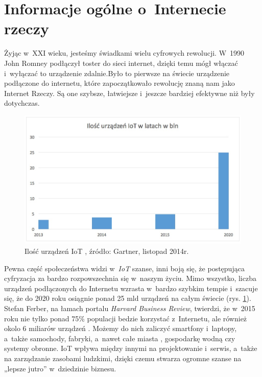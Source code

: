 \documentclass{xmgr}
\begin{document}
\section{Informacje ogólne o~Internecie rzeczy}
	Żyjąc w~XXI wieku, jesteśmy świadkami wielu cyfrowych rewolucji. W~1990 John Romney podłączył toster do sieci internet, dzięki temu mógł włączać i~wyłączać to urządzenie zdalnie\cite{toster}.Było to pierwsze na świecie urządzenie podłączone do internetu, które zapoczątkowało rewolucję znaną nam jako Internet Rzeczy. Są one szybsze, łatwiejsze i~jeszcze bardziej efektywne niż były dotychczas. 
\begin{figure}[h]
\centering
\includegraphics[width=\textwidth]{w}
\caption{Ilość urządzeń IoT , źródło: Gartner, listopad 2014r.}
\label{fig:ilosciot}
\end{figure}
\clearpage
	Pewna część społeczeństwa widzi w~\emph{IoT} szanse, inni boją się, że postępująca cyfryzacja za bardzo rozpowszechnia się w~naszym życiu. Mimo wszystko, liczba urządzeń podłączonych do Internetu wzrasta w~bardzo szybkim tempie i~szacuje się, że do 2020 roku osiągnie ponad 25 mld urządzeń na całym świecie (rys. \ref{fig:ilosciot}).
	Stefan Ferber, na łamach portalu \emph{Harvard Business Review}, twierdzi, że w~2015 roku nie tylko ponad 75\% populacji bedzie korzystać z~Internetu, ale również okolo 6 miliarów urządzeń \cite{harvard}. Możemy do nich zaliczyć smartfony i~laptopy, a~także samochody, fabryki, a~nawet całe miasta \cite{miasta}, gospodarkę wodną czy systemy obronne. IoT wpływa między innymi na projektowanie i~serwis, a~także na zarządzanie zasobami ludzkimi, dzięki czemu stwarza ogromne szanse na „lepsze jutro” w~dziedzinie biznesu. 
\end{document}
